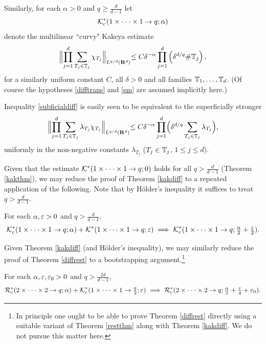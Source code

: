 Similarly, for each $\alpha>0$ and $q\geq\tfrac{d}{d-1}$ let
$${\mathcal{K}}^{*}_{c}(1\times\cdot\cdot\cdot\times 1\rightarrow q;\alpha)
$$
denote the multilinear ``curvy" Kakeya estimate
\begin{equation}\label{subficialdiff}
\Bigl\|\prod_{j=1}^{d}\sum_{T_{j}\in{\mathbb{T}}_{j}}\chi_{T_{j}}\Bigl\|_{L^{q/d}
({\bf R}^d)}\leq C
\delta^{-\alpha}\prod_{j=1}^{d}\left(\delta^{d/q}\mbox{\#}{\mathbb{T}}_{j}\right),
\end{equation}
for a similarly uniform constant $C$, all $\delta>0$ and all
families ${\mathbb{T}}_{1},\hdots,{\mathbb{T}}_{d}$. (Of course the hypotheses
\eqref{difftrans} and \eqref{sm} are assumed implicitly here.)
\begin{remark}
Inequality \eqref{subficialdiff} is easily seen to be equivalent
to the superficially stronger
\begin{equation}\label{superficialdiff}
\Bigl\|\prod_{j=1}^{d}\sum_{T_{j}\in{\mathbb{T}}_{j}}\lambda_{T_{j}}\chi_{T_{j}}\Bigl\|_{L^{q/d}
({\bf R}^d)}\leq C
\delta^{-\alpha}\prod_{j=1}^{d}\Bigl(\delta^{d/q}\sum_{T_{j}\in{\mathbb{T}}_{j}}\lambda_{T_{j}}\Bigr),
\end{equation}
uniformly in the non-negative constants $\lambda_{T_{j}}$
($T_{j}\in{\mathbb{T}}_{j}$, $1\leq j\leq d$).
\end{remark}
Given that the estimate ${\mathcal{K}}^*(1\times\cdot\cdot\cdot\times
1\rightarrow q;0)$ holds for all $q>\tfrac{d}{d-1}$ (Theorem
\ref{kakthm}), we may reduce the proof of Theorem \ref{kakdiff} to
a repeated application of the following. Note that by H\"older's
inequality it suffices to treat $q>\tfrac{d}{d-1}$.
\begin{proposition}\label{prokak}
For each $\alpha,\varepsilon>0$ and $q>\tfrac{d}{d-1}$,
$$
{\mathcal{K}}_{c}^{*}(1\times\cdot\cdot\cdot\times 1\rightarrow q;\alpha)+
{\mathcal{K}}^{*}(1\times\cdots\times 1\rightarrow q;\varepsilon) \implies
{\mathcal{K}}_{c}^{*}(1\times\cdot\cdot\cdot\times 1\rightarrow
q;\tfrac{\alpha}{2}+\tfrac{\varepsilon}{2}).
$$
\end{proposition}
Given Theorem \ref{kakdiff} (and H\"older's inequality), we may
similarly reduce the proof of Theorem \ref{diffrest} to a
bootstrapping argument.\footnote{In principle one ought to be able
to prove Theorem \ref{diffrest} directly using a suitable variant
of Theorem \ref{restthm} along with Theorem \ref{kakdiff}. We do
not pursue this matter here.}
\begin{proposition}\label{prorest}
For each $\alpha,\varepsilon,\varepsilon_{0}>0$ and $q>\tfrac{2d}{d-1}$,
$$
{\mathcal{R}}_{c}^{*}(2\times\cdot\cdot\cdot\times 2\rightarrow q;\alpha)+
{\mathcal{K}}_{c}^{*}(1\times\cdot\cdot\cdot\times 1\rightarrow
\tfrac{q}{2};\varepsilon) \implies
{\mathcal{R}}_{c}^{*}(2\times\cdot\cdot\cdot\times 2\rightarrow
q;\tfrac{\alpha}{2}+\tfrac{\varepsilon}{4}+\varepsilon_{0}).
$$
\end{proposition}
